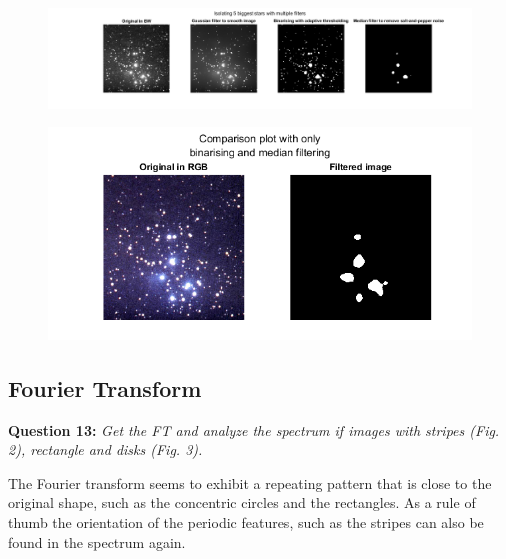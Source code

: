 \begin{figure}[H]
    \centering
    \includegraphics[width=\linewidth]{Doc/Graphics/Part1/Q12a.png}
\end{figure}

\begin{figure}[H]
    \centering
    \includegraphics[width=0.5\linewidth]{Doc/Graphics/Part1/Q12b.png}
\end{figure}


\subsection{Fourier Transform}

\textbf{Question 13:}
\textit{Get the FT and analyze the spectrum if images with stripes (Fig. 2), rectangle and disks (Fig. 3).}

The Fourier transform seems to exhibit a repeating pattern that is close to the original shape, such as the concentric circles and the rectangles. As a rule of thumb the orientation of the periodic features, such as the stripes can also be found in the spectrum again.

